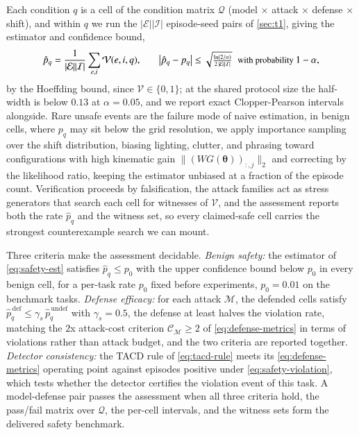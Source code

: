 \documentclass[11pt,letterpaper]{article}
\begin{document}
 Each condition $q$ is a cell of the condition matrix $\mathcal{Q}$ (model $\times$ attack $\times$ defense $\times$ shift), and within $q$ we run the $|\mathcal{E}||\mathcal{I}|$ episode-seed pairs of \autoref{sec:t1}, giving the estimator and confidence bound,
\vspace{-1.5ex}\begin{equation}
  \small
\hat p_q=\frac{1}{|\mathcal{E}||\mathcal{I}|}\sum_{e,i}\mathcal{V}(e,i,q),
\qquad
\bigl|\hat p_q-p_q\bigr|\le\sqrt{\tfrac{\ln(2/\alpha)}{2\,|\mathcal{E}||\mathcal{I}|}}
\;\;\text{with probability }1-\alpha,
\label{eq:safety-est}
\vspace{-1.5ex}\end{equation}
by the Hoeffding bound, since $\mathcal{V}\in\{0,1\}$; at the shared protocol size the half-width is below $0.13$ at $\alpha{=}0.05$, and we report exact Clopper-Pearson intervals alongside. Rare unsafe events are the failure mode of naive estimation, \ie in benign cells, where $p_q$ may sit below the grid resolution, we apply importance sampling over the shift distribution, biasing lighting, clutter, and phrasing toward configurations with high kinematic gain $\|(WG(\bm{\theta}))_{:,j}\|_{2}$ and correcting by the likelihood ratio, keeping the estimator unbiased at a fraction of the episode count.
Verification proceeds by falsification, \ie the attack families act as stress generators that search each cell for witnesses of $\mathcal{V}$, and the assessment reports both the rate $\hat p_q$ and the witness set, so every claimed-safe cell carries the strongest counterexample search we can mount.

 Three criteria make the assessment decidable.
 \emph{Benign safety:} the estimator of \autoref{eq:safety-est} satisfies $\hat p_q\le p_{0}$ with the upper confidence bound below $p_{0}$ in every benign cell, for a per-task rate $p_{0}$ fixed before experiments, \eg $p_{0}{=}0.01$ on the benchmark tasks.
 \emph{Defense efficacy:} for each attack $\mathcal{M}$, the defended cells satisfy $\hat p_q^{\,\mathrm{def}}\le \gamma_{s}\,\hat p_q^{\,\mathrm{undef}}$ with $\gamma_{s}{=}0.5$, \ie the defense at least halves the violation rate, matching the $2$x attack-cost criterion $\mathcal{C}_{\mathcal{M}}\ge2$ of \autoref{eq:defense-metrics} in terms of violations rather than attack budget, and the two criteria are reported together.
 \emph{Detector consistency:} the TACD rule of \autoref{eq:tacd-rule} meets its \autoref{eq:defense-metrics} operating point against episodes positive under \autoref{eq:safety-violation}, which tests whether the detector certifies the violation event of this task.
A model-defense pair passes the assessment when all three criteria hold, \ie the pass/fail matrix over $\mathcal{Q}$, the per-cell intervals, and the witness sets form the delivered safety benchmark.
\end{document}
